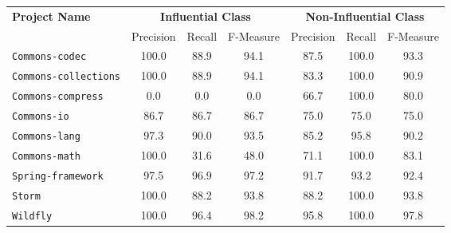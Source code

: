 \centering
\resizebox{0.9\linewidth}{!}
{
\begin{tabular}{l | c c c | c c c}
  \multirow{2}{*}{\bf Project Name} & 
  \multicolumn{3}{c|}{\bf Influential Class} & 
  \multicolumn{3}{c}{\bf Non-Influential Class} \\
  & Precision & Recall & F-Measure & Precision & Recall & F-Measure \\

\toprule

{\tt Commons-codec}
& 100.0 & 88.9 & 94.1 & 87.5 & 100.0 & 93.3 \\
{\tt Commons-collections}
& 100.0 & 88.9 & 94.1 & 83.3 & 100.0 & 90.9 \\
{\tt Commons-compress}
& 0.0 & 0.0 & 0.0 & 66.7 & 100.0 & 80.0 \\
{\tt Commons-io}
& 86.7 & 86.7 & 86.7 & 75.0 & 75.0 & 75.0 \\
{\tt Commons-lang}
& 97.3 & 90.0 & 93.5 & 85.2 & 95.8 & 90.2 \\
{\tt Commons-math}
& 100.0 & 31.6 & 48.0 & 71.1 & 100.0 & 83.1 \\
{\tt Spring-framework}
& 97.5 & 96.9 & 97.2 & 91.7 & 93.2 & 92.4 \\
{\tt Storm}
& 100.0 & 88.2 & 93.8 & 88.2 & 100.0 & 93.8 \\
{\tt Wildfly}
& 100.0 & 96.4 & 98.2 & 95.8 & 100.0 & 97.8 \\

\bottomrule
\end{tabular}
}
